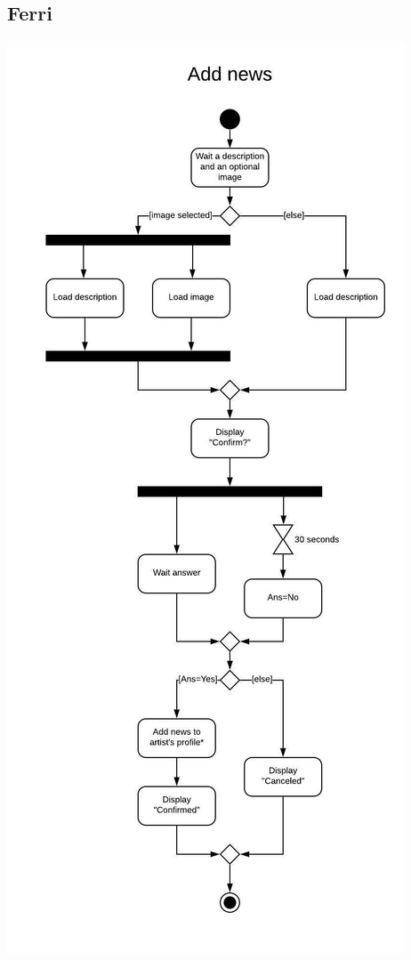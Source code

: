 \documentclass[11pt,a4paper]{article}
\begin{document}
\begin{itemize}
\subsection{Ferri}
\includegraphics[scale=0.5]{addnews1.jpeg}

\end{itemize}
\end{document}
